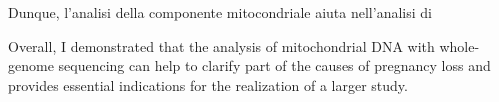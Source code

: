 
Dunque, l'analisi della componente mitocondriale aiuta nell'analisi di 








Overall, I demonstrated that the analysis of mitochondrial DNA with whole-genome sequencing  can help to clarify part of the causes of pregnancy loss and provides essential indications for the realization of a larger study.


